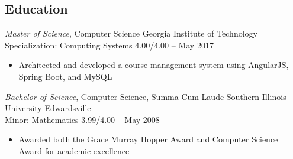 \documentclass[margin,line]{resume}
\begin{document}
\begin{resume}
\section{Education}
{\small
  {\sl Master of Science}, Computer Science \hfill
  Georgia Institute of Technology\\
  Specialization: Computing Systems \hfill
  4.00/4.00 -- May 2017
}
\begin{itemize} \itemsep -2pt %
\small\item Architected and developed a course management system using AngularJS, Spring Boot, and MySQL
\end{itemize}
\vspace{4pt}
{\small
  {\sl Bachelor of Science}, Computer Science, Summa Cum Laude \hfill
  Southern Illinois University Edwardsville\\
  Minor: Mathematics \hfill
  3.99/4.00 -- May 2008
}
\begin{itemize} \itemsep -2pt %
\small\item Awarded both the Grace Murray Hopper Award and Computer Science Award for academic excellence
\end{itemize}



\end{resume}
\end{document}
